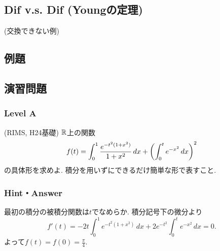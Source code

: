 


\newpage

\newpage
\subsection{Dif v.s. Dif (Youngの定理)}
\begin{eg} (交換できない例)

\end{eg}
















\subsection{例題}


\subsection{演習問題}
\subsubsection{Level A}
\begin{prob} (RIMS, H24基礎)
$\mathbb{R}$上の関数
\[f(t) = \int_{0}^{1} \dfrac{e^{-t^2(1+x^2)}}{1+x^2}\, dx + \left( \int_{0}^{t}e^{-x^2}\, dx \right)^2\]
の具体形を求めよ. 積分を用いずにできるだけ簡単な形で表すこと.
\end{prob}
\newpage
\subsubsection{Hint・Answer}
{\small
\begin{ans}
最初の積分の被積分関数は$t$でなめらか. 積分記号下の微分より
\[f'(t) = -2t\int_{0}^{1} e^{-t^2(1+x^2)}\, dx + 2e^{-t^2}\int_{0}^{t} e^{-x^2}\, dx = 0.\]
よって$f(t) = f(0) = \frac{\pi}{4}$.
\end{ans}
}



\clearpage
